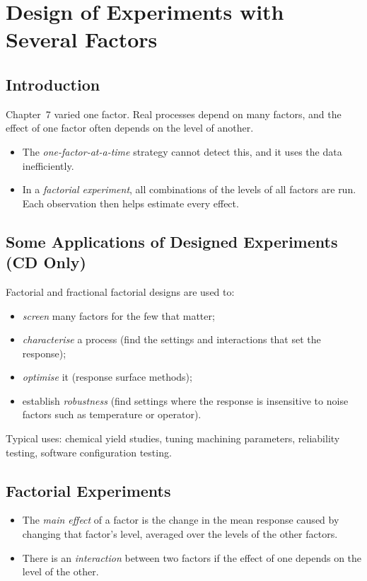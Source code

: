 \chapter{Design of Experiments with Several Factors}

\section{Introduction}

Chapter~7 varied one factor. Real processes depend on many factors, and the effect of one factor often depends on the level of another.
\begin{itemize}
  \item The \emph{one-factor-at-a-time} strategy cannot detect this, and it uses the data inefficiently.
  \item In a \emph{factorial experiment}, all combinations of the levels of all factors are run. Each observation then helps estimate every effect.
\end{itemize}

\section{Some Applications of Designed Experiments (CD Only)}

Factorial and fractional factorial designs are used to:
\begin{itemize}
  \item \emph{screen} many factors for the few that matter;
  \item \emph{characterise} a process (find the settings and interactions that set the response);
  \item \emph{optimise} it (response surface methods);
  \item establish \emph{robustness} (find settings where the response is insensitive to noise factors such as temperature or operator).
\end{itemize}
Typical uses: chemical yield studies, tuning machining parameters, reliability testing, software configuration testing.

\section{Factorial Experiments}

\begin{definition}
\begin{itemize}
  \item The \emph{main effect} of a factor is the change in the mean response caused by changing that factor's level, averaged over the levels of the other factors.
  \item There is an \emph{interaction} between two factors if the effect of one depends on the level of the other.
\end{itemize}
\end{definition}

